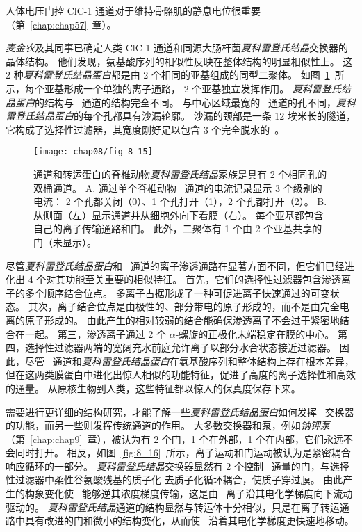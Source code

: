 人体电压门控 ClC-1 通道对于维持骨骼肌的静息电位很重要（第~\ref{chap:chap57}~章）。


\textit{麦金农}及其同事已确定人类 ClC-1 通道和同源大肠杆菌\textit{夏科雷登氏结晶}交换器的晶体结构。
他们发现，氨基酸序列的相似性反映在整体结构的明显相似性上。
这 2 种\textit{夏科雷登氏结晶蛋白}都是由 2 个相同的亚基组成的同型二聚体。
如图~\ref{fig:8_15}~所示，每个亚基形成一个单独的离子通路， 2 个亚基独立发挥作用。
\textit{夏科雷登氏结晶蛋白}的结构与~ 通道的结构完全不同。
与中心区域最宽的~ 通道的孔不同，\textit{夏科雷登氏结晶蛋白}的每个孔都具有沙漏轮廓。
沙漏的颈部是一条 12 埃米长的隧道，它构成了选择性过滤器，其宽度刚好足以包含 3 个完全脱水的~。


\begin{figure}[htbp]
	\centering
	\texttt{[image: chap08/fig\_8\_15]}
	\caption{ 通道和转运蛋白的脊椎动物\textit{夏科雷登氏结晶}家族是具有 2 个相同孔的双桶通道。
		A. 通过单个脊椎动物~ 通道的电流记录显示 3 个级别的电流：
		2 个孔都关闭（0）、1 个孔打开（1），2 个孔都打开（2）。
		B. 从侧面（左）显示通道并从细胞外向下看膜（右）。
		每个亚基都包含自己的离子传输通路和门。
		此外，二聚体有 1 个由 2 个亚基共享的门（未显示）。}
	\label{fig:8_15}
\end{figure}


尽管\textit{夏科雷登氏结晶蛋白}和~ 通道的离子渗透通路在显著方面不同，但它们已经进化出 4 个对其功能至关重要的相似特征。
首先，它们的选择性过滤器包含渗透离子的多个顺序结合位点。
多离子占据形成了一种可促进离子快速通过的可变状态。
其次，离子结合位点是由极性的、部分带电的原子形成的，而不是由完全电离的原子形成的。
由此产生的相对较弱的结合能确保渗透离子不会过于紧密地结合在一起。
第三，渗透离子通过 2 个 $\alpha$-螺旋的正极化末端稳定在膜的中心。
第四，选择性过滤器两端的宽阔充水前庭允许离子以部分水合状态接近过滤器。
因此，尽管~ 通道和\textit{夏科雷登氏结晶蛋白}在氨基酸序列和整体结构上存在根本差异，但在这两类膜蛋白中进化出惊人相似的功能特征，促进了高度的离子选择性和高效的通量。 
从原核生物到人类，这些特征都以惊人的保真度保存下来。


需要进行更详细的结构研究，才能了解一些\textit{夏科雷登氏结晶蛋白}如何发挥~ 交换器的功能，而另一些则发挥传统通道的作用。
大多数交换器和泵，例如\textit{钠钾泵}（第~\ref{chap:chap9}~章），被认为有 2 个门，1 个在外部，1 个在内部，它们永远不会同时打开。
相反，如图~\ref{fig:8_16}~所示，离子运动和门运动被认为是紧密耦合响应循环的一部分。
\textit{夏科雷登氏结晶}交换器显然有 2 个控制~ 通量的门，与选择性过滤器中柔性谷氨酸残基的质子化-去质子化循环耦合，使质子穿过膜。
由此产生的构象变化使~ 能够逆其浓度梯度传输，这是由~ 离子沿其电化学梯度向下流动驱动的。
\textit{夏科雷登氏结晶}通道的结构显然与转运体十分相似，只是在离子转运通路中具有改进的门和微小的结构变化，从而使~ 沿着其电化学梯度更快速地移动。


